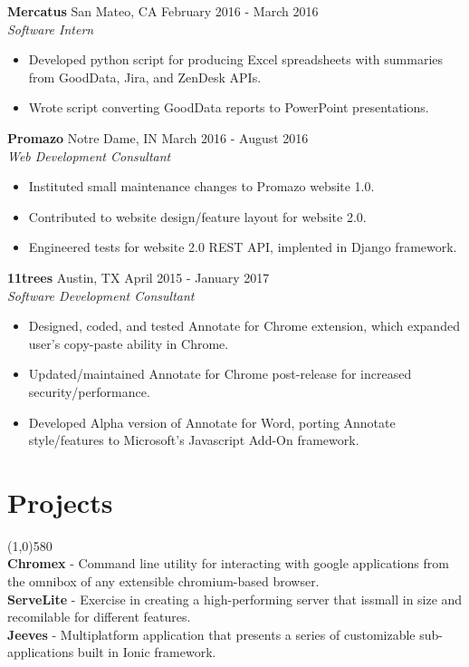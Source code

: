 \documentclass[9pt]{article}
\begin{document}
    \textbf{Mercatus}
    \hfill
    San Mateo, CA
    \hfill
    February 2016 - March 2016
    \\
    \textit{Software Intern}
    \begin{itemize}
      \item Developed python script for producing Excel spreadsheets with summaries from GoodData, Jira, and ZenDesk APIs.
      \item Wrote script converting GoodData reports to PowerPoint presentations.
    \end{itemize}
    
    \textbf{Promazo}
    \hfill
    Notre Dame, IN
    \hfill
    March 2016 - August 2016
    \\
    \textit{Web Development Consultant}
    \begin{itemize}
      \item Instituted small maintenance changes to Promazo website 1.0.
      \item Contributed to website design/feature layout for website 2.0.
      \item Engineered tests for website 2.0 REST API, implented in Django framework.
    \end{itemize}
  
    \textbf{11trees}
    \hfill
    Austin, TX
    \hfill
    April 2015 - January 2017
    \\
    \textit{Software Development Consultant}
    \begin{itemize}
      \item Designed, coded, and tested Annotate for Chrome extension, which expanded user's copy-paste ability in Chrome.
      \item Updated/maintained Annotate for Chrome post-release for increased security/performance.
      \item Developed Alpha version of Annotate for Word, porting Annotate style/features to Microsoft's Javascript Add-On framework.
    \end{itemize}
 

  \vspace{-16pt}
  \section*{Projects}
    \vspace{-16pt}
    \line(1,0){580}\\
    \textbf{Chromex} - Command line utility for interacting with google applications from the omnibox of any extensible chromium-based browser.
    \\
    \textbf{ServeLite} - Exercise in creating a high-performing server that issmall in size and recomilable for different features.
    \\
    \textbf{Jeeves} - Multiplatform application that presents a series of customizable sub-applications built in Ionic framework.
\end{document}
